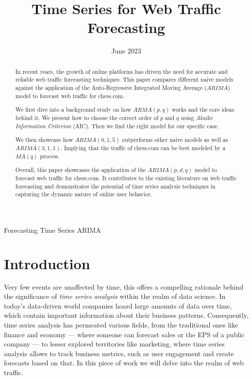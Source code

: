 \documentclass[journal]{IEEEtran}
\title{Time Series for Web Traffic Forecasting}
\author{}
\author{
  \IEEEauthorblockN{Benjamín Santana Velázquez}
  \IEEEauthorblockA{\\
    Universidad Panamericana\\
    Email: 0211518@up.edu.mx}
}
\date{June 2023}
\begin{document}
\maketitle

\begin{abstract}
    In recent years, the growth of online platforms has driven the need for
    accurate and reliable web traffic forecasting techniques. This paper
    compares different naive models against the application of the
    Auto-Regressive Integrated Moving Average ($ARIMA$) model to forecast web
    traffic for chess.com.

    We first dive into a background study on how $ARMA(p,q)$ works and the core
    ideas behind it. We present how to choose the correct order of $p$ and $q$
    using \emph{Akaike Information Criterion} (AIC). Then we find the right
    model for our specific case.

    We then showcase how $ARIMA(0,1,5)$ outperforms other naive models as well
    as $ARIMA(3,1,1)$. Implying that the traffic of chess.com can be best
    modeled by a $MA(q)$ process.

    Overall, this paper showcases the application of the $ARIMA(p,d,q)$ model
    to forecast web traffic for chess.com. It contributes to the existing
    literature on web traffic forecasting and demonstrates the potential of
    time series analysis techniques in capturing the dynamic nature of online
    user behavior.
\end{abstract}

\begin{IEEEkeywords}
    Forecasting
    Time Series
    ARIMA
\end{IEEEkeywords}

\section{Introduction}\label{sec:intro}
Very few events are unaffected by time, this offers a compelling rationale
behind the significance of \emph{time series analysis} within the
realm of data science. In today's data-driven world companies hoard large
amounts of data over time, which contain important information about their
business patterns. Consequently, time series analysis has permeated various
fields, from the traditional ones like finance and economy --- where someone
can forecast sales or the EPS of a public company --- to lesser explored
territories like marketing, where time series analysis allows to track business
metrics, such as user engagement and create forecasts based on that. In this
piece of work we will delve into the realm of web traffic.
\end{document}
